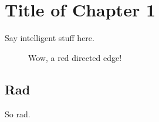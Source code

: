 \chapter{Title of Chapter 1}

Say intelligent stuff here.
\cite{Penrose1971}

\begin{figure}
\centering
{}
\caption{Wow, a red directed edge!}
\end{figure}

\section{Rad}

So rad.
